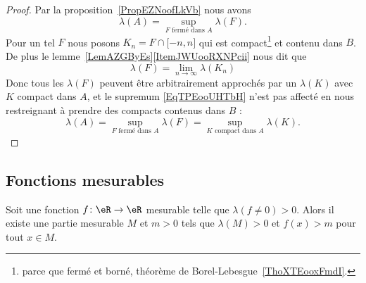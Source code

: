 \begin{proof}
	Par la proposition~\ref{PropEZNoofLkVb} nous avons
	\begin{equation}    \label{EqTPEooUHTbH}
		\lambda(A)=\sup_{ F\text{ fermé dans } A}\lambda(F).
	\end{equation}
	Pour un tel \( F\) nous posons \( K_n=F\cap\mathopen[ -n , n \mathclose]\) qui est compact\footnote{parce que fermé et borné, théorème de Borel-Lebesgue~\ref{ThoXTEooxFmdI}.} et contenu dans \( B\). De plus le lemme~\ref{LemAZGByEs}\ref{ItemJWUooRXNPcii} nous dit que
	\begin{equation}
		\lambda(F)=\lim_{n\to \infty} \lambda(K_n)
	\end{equation}
	Donc tous les \( \lambda(F)\) peuvent être arbitrairement approchés par un \( \lambda(K)\) avec \( K\) compact dans \( A\), et le supremum \eqref{EqTPEooUHTbH} n'est pas affecté en nous restreignant à prendre des compacts contenus dans \( B\) :
	\begin{equation}
		\lambda(A)=\sup_{ F\text{ fermé dans } A}\lambda(F)=\sup_{ K\text{ compact dans } A}\lambda(K).
	\end{equation}
\end{proof}

\subsection{Fonctions mesurables}

\begin{lemma}
	Soit une fonction \( f\colon \eR\to \eR\) mesurable telle que \( \lambda(f\neq 0)>0\). Alors il existe une partie mesurable \( M\) et \( m>0\) tels que \( \lambda(M)>0\) et \( f(x)>m\) pour tout \( x\in M\).
\end{lemma}

